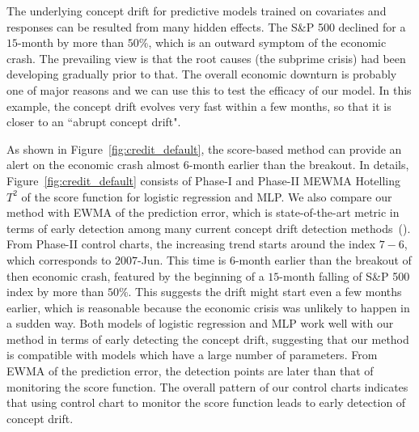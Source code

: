 \documentclass[twoside,11pt]{article}
\begin{document}
The underlying concept drift for predictive models trained on covariates and responses can be resulted from many hidden effects. The S\&P 500 declined for a $15$-month by more than $50\%$, which is an outward symptom of the economic crash. The prevailing view is that the root causes (the subprime crisis) had been developing gradually prior to that. The overall economic downturn is probably one of major reasons and we can use this to test the efficacy of our model. In this example, the concept drift evolves very fast within a few months, so that it is closer to an ``abrupt concept drift".

As shown in Figure~\ref{fig:credit_default}, the score-based method can provide an alert on the economic crash almost $6$-month earlier than the breakout. In details, Figure~\ref{fig:credit_default} consists of Phase-I and Phase-II MEWMA Hotelling $T^2$ of the score function for logistic regression and MLP. We also compare our method with EWMA of the prediction error, which is state-of-the-art metric in terms of early detection among many current concept drift detection methods~(\cite{barros2018large}). From Phase-II control charts, the increasing trend starts around the index $7-6$, which corresponds to $2007$-Jun. This time is $6$-month earlier than the breakout of then economic crash, featured by the beginning of a $15$-month falling of S\&P 500 index by more than $50\%$. This suggests the drift might start even a few months earlier, which is reasonable because the economic crisis was unlikely to happen in a sudden way. Both models of logistic regression and MLP work well with our method in terms of early detecting the concept drift, suggesting that our method is compatible with models which have a large number of parameters. From EWMA of the prediction error, the detection points are later than that of monitoring the score function. The overall pattern of our control charts indicates that using control chart to monitor the score function leads to early detection of concept drift. 
\end{document}
